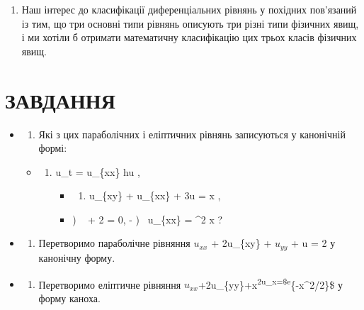\documentclass[
  ukrainian,
]{article}
\providecommand{\tightlist}{%
  \setlength{\itemsep}{0pt}\setlength{\parskip}{0pt}}
\begin{document}
\begin{enumerate}
\def\labelenumi{\arabic{enumi}.}
\setcounter{enumi}{1}
\tightlist
\item
  Наш інтерес до класифікації диференціальних рівнянь у похідних
  пов'язаний із тим, що три основні типи рівнянь описують три різні типи
  фізичних явищ, і ми хотіли б отримати математичну класифікацію цих
  трьох класів фізичних явищ.
\end{enumerate}

\section{ЗАВДАННЯ}\label{ux437ux430ux432ux434ux430ux43dux43dux44f-10}

\begin{itemize}
\item
  \begin{enumerate}
  \def\labelenumi{\arabic{enumi}.}
  \tightlist
  \item
    Які з цих параболічних і еліптичних рівнянь записуються у канонічній
    формі:
  \end{enumerate}

  \begin{itemize}
  \tightlist
  \item
    \begin{enumerate}
    \def\labelenumi{\alph{enumi})}
    \tightlist
    \item
      u\_t = u\_\{xx\} hu ,

      \begin{itemize}
      \tightlist
      \item
        \begin{enumerate}
        \def\labelenumii{\arabic{enumii})}
        \setcounter{enumii}{5}
        \tightlist
        \item
          u\_\{xy\} + u\_\{xx\} + 3u = \sin x ,
        \end{enumerate}
      \item
        ) ~ + 2 = 0, - )
        ~u\_\{xx\} = \sin\^{}2 x ?
      \end{itemize}
    \end{enumerate}
  \end{itemize}
\item
  \begin{enumerate}
  \def\labelenumi{\arabic{enumi}.}
  \setcounter{enumi}{1}
  \tightlist
  \item
    Перетворимо параболічне рівняння \(u_{xx}\) + 2u\_\{xy\} +
    \(u_{yy}\) + u = 2 у канонічну форму.
  \end{enumerate}
\item
  \begin{enumerate}
  \def\labelenumi{\arabic{enumi}.}
  \setcounter{enumi}{2}
  \tightlist
  \item
    Перетворимо еліптичне рівняння
    \(u_{xx}\)+2u\_\{yy\}+x\textsuperscript{2u\_x=\$e}\{-x\^{}2/2\}\$ у
    форму каноха.
  \end{enumerate}
\end{itemize}
\end{document}
